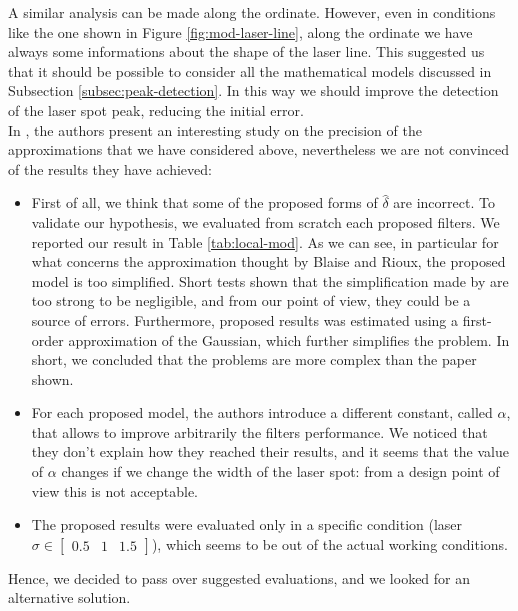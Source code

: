 A similar analysis can be made along the ordinate. However, even in conditions like the one shown in Figure \ref{fig:mod-laser-line}, along the ordinate we have always some informations about the shape of the laser line. This suggested us that it should be possible to consider all the mathematical models discussed in Subsection \ref{subsec:peak-detection}. In this way we should improve the detection of the laser spot peak, reducing the initial error. \\
In \cite{Naidu1991}, the authors present an interesting study on the precision of the approximations that we have considered above, nevertheless we are not convinced of the results they have achieved:
  \begin{itemize}
    \item First of all, we think that some of the proposed forms of $\hat{\delta}$ are incorrect. To validate our hypothesis, we evaluated from scratch each proposed filters. We reported our result in Table \ref{tab:local-mod}. As we can see, in particular for what concerns the approximation thought by Blaise and Rioux, the proposed model is too simplified. Short tests shown that the simplification made by \cite{Naidu1991} are too strong to be negligible, and from our point of view, they could be a source of errors. Furthermore, proposed results was estimated using a first-order approximation of the Gaussian, which further simplifies the problem. In short, we concluded that the problems are more complex than the paper shown.
    \item For each proposed model, the authors introduce a different constant, called $\alpha$, that allows to improve arbitrarily the filters performance. We noticed that they don't explain how they reached their results, and it seems that the value of $\alpha$ changes if we change the width of the laser spot: from a design point of view this is not acceptable.
    \item The proposed results were evaluated only in a specific condition (laser $\sigma \in \begin{bmatrix} 0.5 & 1 & 1.5 \end{bmatrix}$), which seems to be out of the actual working conditions.
  \end{itemize}
Hence, we decided to pass over suggested evaluations, and we looked for an alternative solution. \\
  

